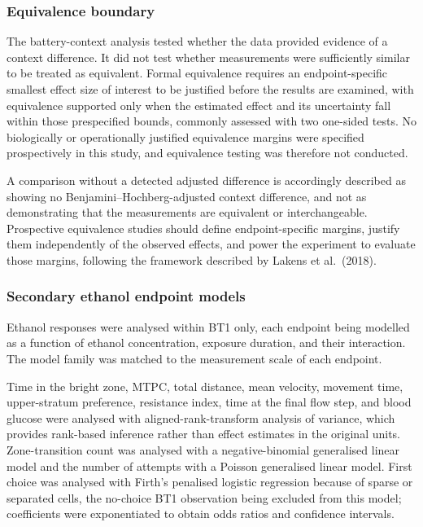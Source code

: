 \documentclass[12pt,a4paper]{article}
\begin{document}
\subsubsection{Equivalence boundary}
\label{sec:equivalence}
The battery-context analysis tested whether the data provided evidence of a context difference. It did not test whether measurements were sufficiently similar to be treated as equivalent. Formal equivalence requires an endpoint-specific smallest effect size of interest to be justified before the results are examined, with equivalence supported only when the estimated effect and its uncertainty fall within those prespecified bounds, commonly assessed with two one-sided tests. No biologically or operationally justified equivalence margins were specified prospectively in this study, and equivalence testing was therefore not conducted.

A comparison without a detected adjusted difference is accordingly described as showing no Benjamini--Hochberg-adjusted context difference, and not as demonstrating that the measurements are equivalent or interchangeable. Prospective equivalence studies should define endpoint-specific margins, justify them independently of the observed effects, and power the experiment to evaluate those margins, following the framework described by Lakens et al.\ (2018).

\subsubsection{Secondary ethanol endpoint models}
\label{sec:ethanol-statistics}
Ethanol responses were analysed within BT1 only, each endpoint being modelled as a function of ethanol concentration, exposure duration, and their interaction. The model family was matched to the measurement scale of each endpoint.

Time in the bright zone, MTPC, total distance, mean velocity, movement time, upper-stratum preference, resistance index, time at the final flow step, and blood glucose were analysed with aligned-rank-transform analysis of variance, which provides rank-based inference rather than effect estimates in the original units. Zone-transition count was analysed with a negative-binomial generalised linear model and the number of attempts with a Poisson generalised linear model. First choice was analysed with Firth's penalised logistic regression because of sparse or separated cells, the no-choice BT1 observation being excluded from this model; coefficients were exponentiated to obtain odds ratios and confidence intervals.
\end{document}
